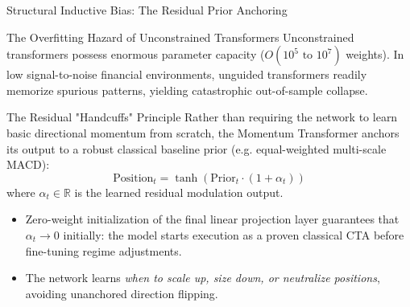 \documentclass[10pt]{beamer}
\begin{document}
\begin{frame}{Structural Inductive Bias: The Residual Prior Anchoring}
  \begin{alertblock}{The Overfitting Hazard of Unconstrained Transformers}
    Unconstrained transformers possess enormous parameter capacity ($O(10^5 \text{ to } 10^7)$ weights). In low signal-to-noise financial environments, unguided transformers readily memorize spurious patterns, yielding catastrophic out-of-sample collapse.
  \end{alertblock}
  \begin{block}{The Residual "Handcuffs" Principle}
    Rather than requiring the network to learn basic directional momentum from scratch, the Momentum Transformer anchors its output to a robust classical baseline prior (e.g. equal-weighted multi-scale MACD):
    \begin{equation*}
      \text{Position}_t = \tanh\left(\text{Prior}_t \cdot (1 + \alpha_t)\right)
    \end{equation*}
    where $\alpha_t \in \mathbb{R}$ is the learned residual modulation output.
  \end{block}
  \begin{itemize}\scriptsize
    \item Zero-weight initialization of the final linear projection layer guarantees that $\alpha_t \to 0$ initially: the model starts execution as a proven classical CTA before fine-tuning regime adjustments.
    \item The network learns \emph{when to scale up, size down, or neutralize positions}, avoiding unanchored direction flipping.
  \end{itemize}
\end{frame}
\end{document}
